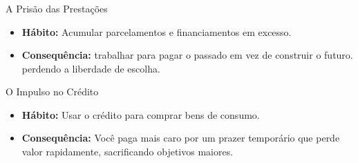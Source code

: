 \begin{frame}[c]\frametitle{}

  \begin{block}{\large \color{red}\quad A Prisão das Prestações}
    \begin{itemize}
      \item  \textbf{Hábito:} Acumular parcelamentos e financiamentos em excesso.
      \item \textbf{Consequência:} trabalhar para pagar o passado em vez de construir o futuro. perdendo a liberdade de escolha.
    \end{itemize}
  \end{block}

  \vspace{1cm}\pause

  \begin{block}{\large \color{brown}\quad O Impulso no Crédito}
    \begin{itemize}
      \item \textbf{Hábito:} Usar o crédito para comprar bens de consumo.
      \item \textbf{Consequência:} Você paga mais caro por um prazer temporário que perde valor rapidamente, sacrificando objetivos maiores.
    \end{itemize}
  \end{block}
\end{frame}